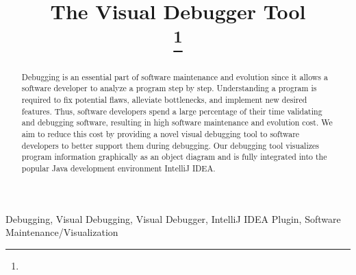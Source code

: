 \documentclass[conference]{IEEEtran}
\newcommand{\intellij}{IntelliJ IDEA}
\begin{document}
\title{The Visual Debugger Tool\\
{}
\thanks{}
}
\author{
}

\maketitle

\begin{abstract}
Debugging is an essential part of software maintenance and evolution since it allows a software developer to analyze a program step by step.
Understanding a program is required to fix potential flaws, alleviate bottlenecks, and implement new desired features.
Thus, software developers spend a large percentage of their time validating and debugging software, resulting in high software maintenance and evolution cost.
We aim to reduce this cost by providing a novel visual debugging tool to software developers to better support them during debugging.
Our debugging tool visualizes program information graphically as an object diagram and is fully integrated into the popular Java development environment \intellij{}.
\end{abstract}

\begin{IEEEkeywords}
Debugging, Visual Debugging, Visual Debugger, IntelliJ IDEA Plugin, Software Maintenance/Visualization
\end{IEEEkeywords}
\end{document}
